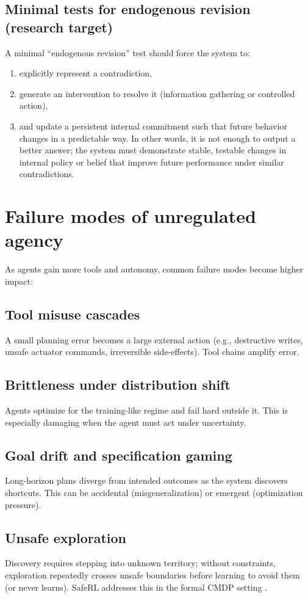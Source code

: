 \documentclass[11pt]{article}
\begin{document}
\subsection{Minimal tests for endogenous revision (research target)}
A minimal “endogenous revision” test should force the system to:
\begin{enumerate}
\item explicitly represent a contradiction,
\item generate an intervention to resolve it (information gathering or controlled action),
\item and update a persistent internal commitment such that future behavior changes in a predictable
way.
In other words, it is not enough to output a better answer; the system must demonstrate
stable, testable changes in internal policy or belief that improve future performance under similar
contradictions.
\end{enumerate}
\section{Failure modes of unregulated agency}
As agents gain more tools and autonomy, common failure modes become higher impact:
\subsection{Tool misuse cascades}
A small planning error becomes a large external action (e.g., destructive writes, unsafe actuator
commands, irreversible side-effects). Tool chains amplify error.
\subsection{Brittleness under distribution shift}
Agents optimize for the training-like regime and fail hard outside it. This is especially damaging
when the agent must act under uncertainty.
\subsection{Goal drift and specification gaming}
Long-horizon plans diverge from intended outcomes as the system discovers shortcuts. This can be
accidental (misgeneralization) or emergent (optimization pressure).
\subsection{Unsafe exploration}
Discovery requires stepping into unknown territory; without constraints, exploration repeatedly
crosses unsafe boundaries before learning to avoid them (or never learns). SafeRL addresses this in
the formal CMDP setting \citep{kushwaha2025saferl_cmdp_survey,ni2025safe_exploration_cmdp}.
\end{document}
